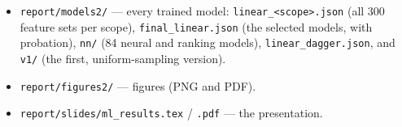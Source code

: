 \documentclass[10pt,a4paper]{article}
\newcommand{\code}[1]{\texttt{#1}}
\begin{document}
\begin{itemize}
\item \code{report/\allowbreak{}models2/\allowbreak{}} — every trained model: \code{linear\_\allowbreak{}<scope>.\allowbreak{}json} (all 300 feature sets per scope), \code{final\_\allowbreak{}linear.\allowbreak{}json} (the selected models, with probation), \code{nn/\allowbreak{}} (84 neural and ranking models), \code{linear\_\allowbreak{}dagger.\allowbreak{}json}, and \code{v1/\allowbreak{}} (the first, uniform-sampling version).
\item \code{report/\allowbreak{}figures2/\allowbreak{}} — figures (PNG and PDF).
\item \code{report/\allowbreak{}slides/\allowbreak{}ml\_\allowbreak{}results.\allowbreak{}tex} / \code{.\allowbreak{}pdf} — the presentation.
\end{itemize}
\end{document}
